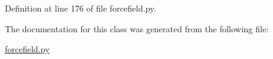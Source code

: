 Definition at line 176 of file forcefield.\-py.



The documentation for this class was generated from the following file\-:\begin{DoxyCompactItemize}
\item 
\hyperlink{forcefield_8py}{forcefield.\-py}\end{DoxyCompactItemize}
